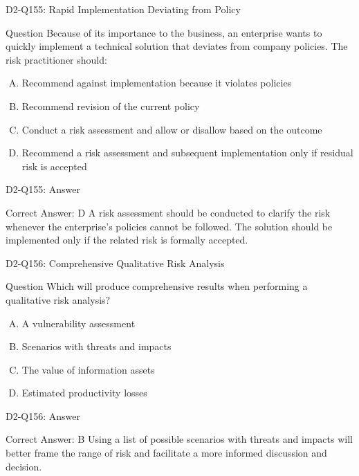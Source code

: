 \documentclass{beamer}
\begin{document}
	\begin{frame}{D2-Q155: Rapid Implementation Deviating from Policy}
		\begin{block}{Question}
			Because of its importance to the business, an enterprise wants to quickly implement a technical solution that deviates from company policies. The risk practitioner should:
		\end{block}
		\begin{enumerate}[(A)]
			\item Recommend against implementation because it violates policies
			\item Recommend revision of the current policy
			\item Conduct a risk assessment and allow or disallow based on the outcome
			\item Recommend a risk assessment and subsequent implementation only if residual risk is accepted
		\end{enumerate}
	\end{frame}
	\begin{frame}{D2-Q155: Answer}
		\begin{block}{Correct Answer: D}
			A risk assessment should be conducted to clarify the risk whenever the enterprise's policies cannot be followed. The solution should be implemented only if the related risk is formally accepted.
		\end{block}
	\end{frame}
	
	\begin{frame}{D2-Q156: Comprehensive Qualitative Risk Analysis}
		\begin{block}{Question}
			Which will produce comprehensive results when performing a qualitative risk analysis?
		\end{block}
		\begin{enumerate}[(A)]
			\item A vulnerability assessment
			\item Scenarios with threats and impacts
			\item The value of information assets
			\item Estimated productivity losses
		\end{enumerate}
	\end{frame}
	\begin{frame}{D2-Q156: Answer}
		\begin{block}{Correct Answer: B}
			Using a list of possible scenarios with threats and impacts will better frame the range of risk and facilitate a more informed discussion and decision.
		\end{block}
	\end{frame}
	
\end{document}
